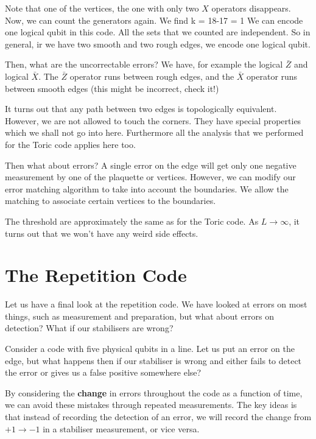Note that one of the vertices, the one with only two $X$ operators disappears. Now, we can count the generators again. We find
\beq
k = 18-17 = 1
\eeq
We can encode one logical qubit in this code. All the sets that we counted are independent. So in general, ir we have two smooth and two rough edges, we encode one logical qubit. 

Then, what are the uncorrectable errors? We have, for example the logical $\bar{Z}$ and logical $\bar{X}$. The $\bar{Z}$ operator runs between rough edges, and the $\bar{X}$ operator runs between smooth edges (this might be incorrect, check it!) 


It turns out that any path between two edges is topologically equivalent. However, we are not allowed to touch the corners. They have special properties which we shall not go into here. Furthermore all the analysis that we performed for the Toric code applies here too. 

Then what about errors? A single error on the edge will get only one negative measurement by one of the plaquette or vertices. However, we can modify our error matching algorithm to take into account the boundaries. We allow the matching to associate certain vertices to the boundaries. 

The threshold are approximately the same as for the Toric code. As $L \rightarrow \infty$, it turns out that we won't have any weird side effects. 

\section{The Repetition Code}
Let us have a final look at the repetition code. We have looked at errors on most things, such as measurement and preparation, but what about errors on detection? What if our stabilisers are wrong? 

Consider a code with five physical qubits in a line. Let us put an error on the edge, but what happens then if our stabiliser is wrong and either fails to detect the error or gives us a false positive somewhere else? 

By considering the \textbf{change} in errors throughout the code as a function of time, we can avoid these mistakes through repeated measurements. The key ideas is that instead of recording the detection of an error, we will record the change from $+1 \rightarrow -1$ in a stabiliser measurement, or vice versa. 

